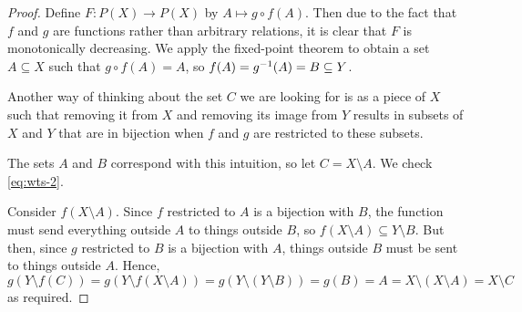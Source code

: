 \documentclass[11pt]{article}
\begin{document}
\begin{proof}
    Define $F : P(X) \to P(X)$ by $A \mapsto g \circ f (A)$.
    Then due to the fact that $f$ and $g$ are functions rather than arbitrary
    relations, it is clear that $F$ is monotonically decreasing.
    We apply the fixed-point theorem to obtain a set $A \subseteq X$ such that
    $g \circ f (A) = A$, so $f(A) = g^{-1}(A) = B \subseteq Y$.

    Another way of thinking about the set $C$ we are looking for is as a piece
    of $X$ such that removing it from $X$ and removing its image from $Y$
    results in subsets of $X$ and $Y$ that are in bijection when $f$ and $g$
    are restricted to these subsets.

    The sets $A$ and $B$ correspond with this intuition, so let
    $C = X \setminus A$. We check \eqref{eq:wts-2}.

    Consider $f(X \setminus A)$. Since $f$ restricted to $A$ is a bijection
    with $B$, the function must send everything outside $A$ to things outside
    $B$, so $f(X \setminus A) \subseteq Y \setminus B$.
    But then, since $g$ restricted to $B$ is a bijection with $A$, things
    outside $B$ must be sent to things outside $A$.
    Hence,
    \begin{equation*}
        g(Y \setminus f(C))
        = g(Y \setminus f(X \setminus A))
        = g(Y \setminus (Y \setminus B))
        = g(B)
        = A
        = X \setminus (X \setminus A)
        = X \setminus C
    \end{equation*}
    as required.
\end{proof}
\end{document}
